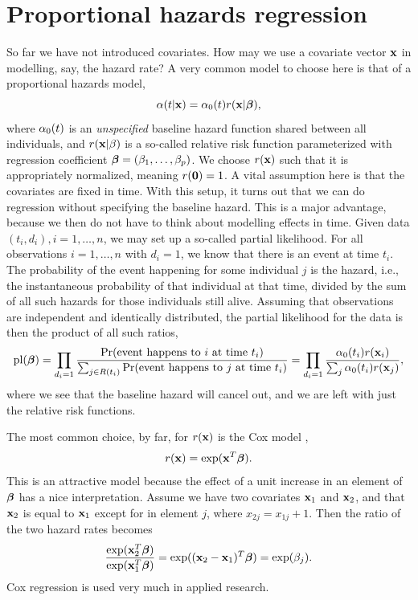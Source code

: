 \section{Proportional hazards regression}
So far we have not introduced covariates. How may we use a covariate vector $\mathbf{x}$ in modelling, say, the hazard rate? A very common model to choose here is that of a proportional hazards model,
\begin{equation}\label{PH}
    \alpha(t|\mathbf{x})=\alpha_0(t)r(\mathbf{x}|\boldsymbol{\beta}),
\end{equation}
where $\alpha_0(t)$ is an \textit{unspecified} baseline hazard function shared between all individuals, and $r(\mathbf{x}|\beta)$ is a so-called relative risk function parameterized with regression coefficient $\boldsymbol{\beta}=(\beta_1,\ldots,\beta_p)$. We choose $r(\mathbf{x})$ such that it is appropriately normalized, meaning $r(\mathbf{0})=1$. A vital assumption here is that the covariates are fixed in time. With this setup, it turns out that we can do regression without specifying the baseline hazard. This is a major advantage, because we then do not have to think about modelling effects in time. Given data $(t_i,d_i),i=1,\ldots,n$, we may set up a so-called partial likelihood.  For all observations $i=1,\ldots,n$ with $d_i=1$, we know that there is an event at time $t_i$. The probability of the event happening for some individual $j$ is the hazard, i.e., the instantaneous probability of that individual at that time, divided by the sum of all such hazards for those individuals still alive. Assuming that observations are independent and identically distributed, the partial likelihood for the data is then the product of all such ratios,
\begin{equation*}
    \operatorname{pl}(\boldsymbol{\beta})=\prod_{d_i=1}\frac{\Pr(\text{event happens to }i\text{ at time }t_i)}{\sum_{j\in R(t_i)}\Pr(\text{event happens to }j\text{ at time }t_i)}=\prod_{d_i=1}\frac{\alpha_0(t_i)r(\mathbf{x}_i)}{\sum_j \alpha_0(t_i)r(\mathbf{x}_j)},
\end{equation*}
where we see that the baseline hazard will cancel out, and we are left with just the relative risk functions.

The most common choice, by far, for $r(\mathbf{x})$ is the Cox model \citep{cox},
\begin{equation*}
    r(\mathbf{x})=\exp(\mathbf{x}^T\boldsymbol{\beta}).
\end{equation*}
This is an attractive model because the effect of a unit increase in an element of $\boldsymbol{\beta}$ has a nice interpretation. Assume we have two covariates $\mathbf{x}_1$ and $\mathbf{x}_2$, and that $\mathbf{x}_2$ is equal to $\mathbf{x}_1$ except for in element $j$, where $x_{2j}=x_{1j}+1$. Then the ratio of the two hazard rates becomes
\begin{equation*}
    \frac{\exp(\mathbf{x}_2^T\boldsymbol{\beta})}{\exp(\mathbf{x}_1^T\boldsymbol{\beta})}=\exp((\mathbf{x}_2-\mathbf{x}_1)^T\boldsymbol{\beta})=\exp(\beta_j).
\end{equation*}
Cox regression is used very much in applied research.

